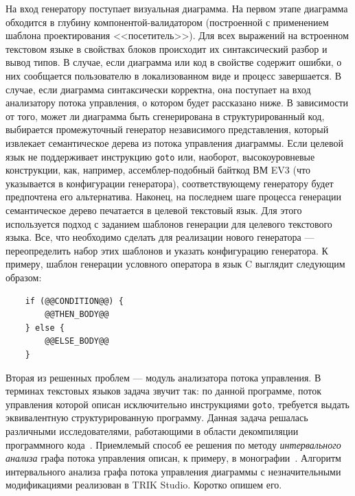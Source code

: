 \documentclass[a5paper]{article}
\begin{document}
На вход генератору поступает визуальная диаграмма. На первом этапе диаграмма обходится в глубину компонентой-валидатором (построенной с применением шаблона проектирования <<посетитель>>). Для всех выражений на встроенном текстовом языке в свойствах блоков происходит их синтаксический разбор и вывод типов. В случае, если диаграмма или код в свойстве содержит ошибки, о них сообщается пользователю в локализованном виде и процесс завершается. В случае, если диаграмма синтаксически корректна, она поступает на вход анализатору потока управления, о котором будет рассказано ниже. В зависимости от того, может ли диаграмма быть сгенерирована в структурированный код, выбирается промежуточный генератор независимого представления, который извлекает семантическое дерева из потока управления диаграммы. Если целевой язык не поддерживает инструкцию \texttt{goto} или, наоборот, высокоуровневые конструкции, как, например, ассемблер-подобный байткод ВМ EV3 (что указывается в конфигурации генератора), соответствующему генератору будет предпочтена его альтернатива. Наконец, на последнем шаге процесса генерации семантическое дерево печатается в целевой текстовый язык. Для этого используется подход с заданием шаблонов генерации для целевого текстового языка. Все, что необходимо сделать для реализации нового генератора --- переопределить набор этих шаблонов и указать конфигурацию генератора. К примеру, шаблон генерации условного оператора в язык C выглядит следующим образом: \begin{verbatim}
    if (@@CONDITION@@) {
        @@THEN_BODY@@
    } else {
        @@ELSE_BODY@@
    }
\end{verbatim}

Вторая из решенных проблем --- модуль анализатора потока управления. В терминах текстовых языков задача звучит так: по данной программе, поток управления которой описан исключительно инструкциями \texttt{goto}, требуется выдать эквивалентную структурированную программу. Данная задача решалась различными исследователями, работающими в области декомпиляции программного кода~\cite{steven1997advanced,деревенец2009структурный}. Приемлемый способ ее решения по методу \textit{интервального анализа} графа потока управления описан, к примеру, в монографии~\cite{steven1997advanced}. Алгоритм интервального анализа графа потока управления диаграммы с незначительными модификациями реализован в TRIK Studio. Коротко опишем его.
\end{document}
